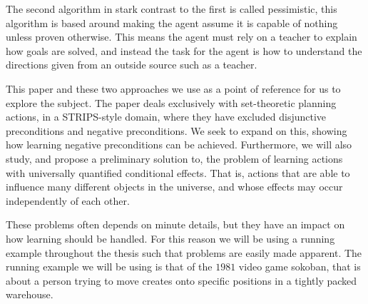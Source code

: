 \documentclass[Master.tex]{subfiles}
\begin{document}
	The second algorithm in stark contrast to the first is called pessimistic, this algorithm is based around making the agent assume it is capable of nothing unless proven otherwise. This means the agent must rely on a teacher to explain how goals are solved, and instead the task for the agent is how to understand the directions given from an outside source such as a teacher.
	
	This paper and these two approaches we use as a point of reference for us to explore the subject.  The paper deals exclusively with set-theoretic planning actions, in a STRIPS-style domain, where they have excluded disjunctive preconditions and negative preconditions. 
	We seek to expand on this, showing how learning negative preconditions can be achieved. Furthermore, we will also study, and propose a preliminary solution to, the problem of learning actions with universally quantified conditional effects. That is, actions that are able to influence many different objects in the universe, and whose effects may occur independently of each other.
	
	These problems often depends on minute details, but they have an impact on how learning should be handled. For this reason we will be using a running example throughout the thesis such that problems are easily made apparent. The running example we will be using is that of the $1981$ video game sokoban, that is about a person trying to move creates onto specific positions in a tightly packed warehouse.
	
\end{document}
